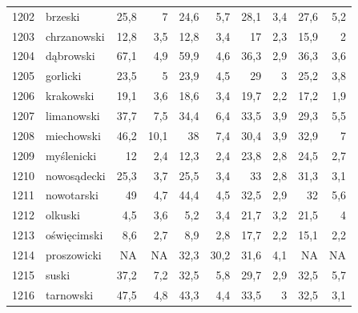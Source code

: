 \begin{center}
\begin{longtable}{lp{3cm}rrrrrrrr}
1202 & brzeski                 & 25,8    & 7           & 24,6     & 5,7          & 28,1     & 3,4          & 27,6     & 5,2          \\
1203 & chrzanowski             & 12,8    & 3,5         & 12,8     & 3,4          & 17       & 2,3          & 15,9     & 2            \\
1204 & dąbrowski               & 67,1    & 4,9         & 59,9     & 4,6          & 36,3     & 2,9          & 36,3     & 3,6          \\
1205 & gorlicki                & 23,5    & 5           & 23,9     & 4,5          & 29       & 3            & 25,2     & 3,8          \\
1206 & krakowski               & 19,1    & 3,6         & 18,6     & 3,4          & 19,7     & 2,2          & 17,2     & 1,9          \\
1207 & limanowski              & 37,7    & 7,5         & 34,4     & 6,4          & 33,5     & 3,9          & 29,3     & 5,5          \\
1208 & miechowski              & 46,2    & 10,1        & 38       & 7,4          & 30,4     & 3,9          & 32,9     & 7            \\
1209 & myślenicki              & 12      & 2,4         & 12,3     & 2,4          & 23,8     & 2,8          & 24,5     & 2,7          \\
1210 & nowosądecki             & 25,3    & 3,7         & 25,5     & 3,4          & 33       & 2,8          & 31,3     & 3,1          \\
1211 & nowotarski              & 49      & 4,7         & 44,4     & 4,5          & 32,5     & 2,9          & 32       & 5,6          \\
1212 & olkuski                 & 4,5     & 3,6         & 5,2      & 3,4          & 21,7     & 3,2          & 21,5     & 4            \\
1213 & oświęcimski             & 8,6     & 2,7         & 8,9      & 2,8          & 17,7     & 2,2          & 15,1     & 2,2          \\
1214 & proszowicki             & NA      & NA          & 32,3     & 30,2         & 31,6     & 4,1          & NA       & NA           \\
1215 & suski                   & 37,2    & 7,2         & 32,5     & 5,8          & 29,7     & 2,9          & 32,5     & 5,7          \\
1216 & tarnowski               & 47,5    & 4,8         & 43,3     & 4,4          & 33,5     & 3            & 32,5     & 3,1          \\

\end{longtable}
\end{center}
